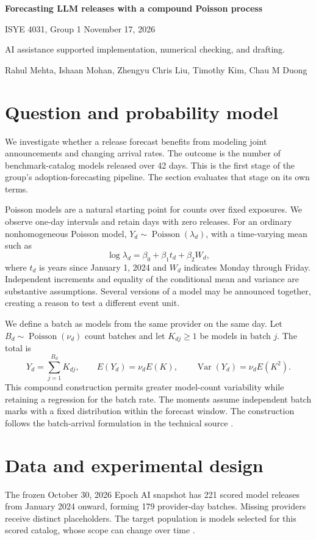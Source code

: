 \documentclass[10pt]{article}
\begin{document}
{\Large\bfseries Forecasting LLM releases with a compound Poisson process}\par
{\small ISYE 4031, Group 1 \hfill November 17, 2026}\par
{\footnotesize AI assistance supported implementation, numerical checking, and drafting.}\par
{\small Rahul Mehta, Ishaan Mohan, Zhengyu Chris Liu, Timothy Kim, Chau M Duong}
\section*{Question and probability model}
We investigate whether a release forecast benefits from modeling joint announcements and changing arrival rates. The outcome is the number of benchmark-catalog models released over 42 days. This is the first stage of the group's adoption-forecasting pipeline. The section evaluates that stage on its own terms.

Poisson models are a natural starting point for counts over fixed exposures. We observe one-day intervals and retain days with zero releases. For an ordinary nonhomogeneous Poisson model, $Y_d\sim\operatorname{Poisson}(\lambda_d)$, with a time-varying mean such as
\[
 \log\lambda_d=\beta_0+\beta_1t_d+\beta_2W_d,
\]
where $t_d$ is years since January 1, 2024 and $W_d$ indicates Monday through Friday. Independent increments and equality of the conditional mean and variance are substantive assumptions. Several versions of a model may be announced together, creating a reason to test a different event unit.

We define a batch as models from the same provider on the same day. Let $B_d\sim\operatorname{Poisson}(\nu_d)$ count batches and let $K_{dj}\geq1$ be models in batch $j$. The total is
\[
 Y_d=\sum_{j=1}^{B_d}K_{dj},\qquad
 E(Y_d)=\nu_d E(K),\qquad
 \operatorname{Var}(Y_d)=\nu_d E(K^2).
\]
This compound construction permits greater model-count variability while retaining a regression for the batch rate. The moments assume independent batch marks with a fixed distribution within the forecast window. The construction follows the batch-arrival formulation in the technical source \cite{compound}.

\section*{Data and experimental design}
The frozen October 30, 2026 Epoch AI snapshot has 221 scored model releases from January 2024 onward, forming 179 provider-day batches. Missing providers receive distinct placeholders. The target population is models selected for this scored catalog, whose scope can change over time \cite{epoch}.
\end{document}
